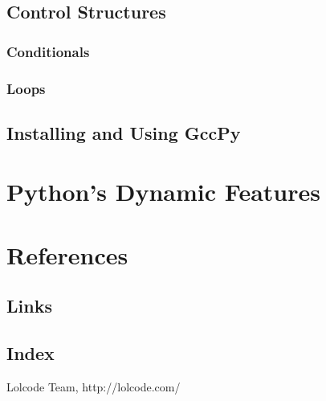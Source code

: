 \documentclass[defaultstyle,11pt]{article}
\begin{document}
\subsection{Control Structures}

\subsubsection{Conditionals}

\subsubsection{Loops}

\subsection{Installing and Using GccPy}

\section{Python's Dynamic Features}




\newpage

\section{References}

\subsection{Links}

\subsection{Index}
\printindex


\begin{thebibliography}{9}

	  Lolcode Team,
	  http://lolcode.com/

\end{thebibliography}
\end{document}
